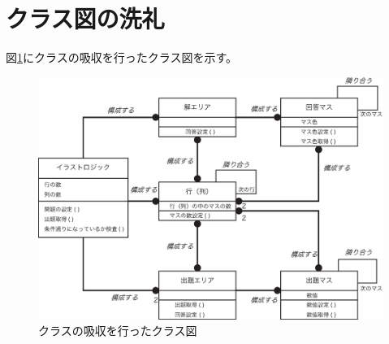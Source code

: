 \documentclass[a4j]{jarticle}
\begin{document}
\section{クラス図の洗礼}
図\ref{fig:class-absorption}にクラスの吸収を行ったクラス図を示す。

\begin{figure}[hp]
\centering
\includegraphics[width=15cm]{./image/class-absorption.eps}
\caption{クラスの吸収を行ったクラス図}
\label{fig:class-absorption}
\end{figure}
\end{document}
